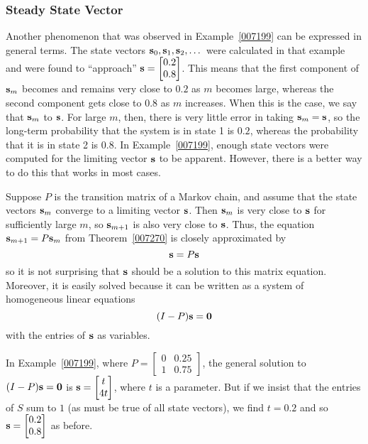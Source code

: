 \documentclass{ximera}
\begin{document}
\subsubsection*{Steady State Vector}

Another phenomenon that was observed in Example~\ref{007199} can be expressed in general terms. The state vectors ${\bf s}_{0}, {\bf s}_{1}, {\bf s}_{2}, \dots$ were calculated in that example and were found to ``approach'' ${\bf s} = \begin{bmatrix}
0.2 \\
0.8
\end{bmatrix}$.
 This means that the first component of ${\bf s}_{m}$ becomes and remains very close to $0.2$ as $m$ becomes large, whereas the second component gets close to $0.8$ as $m$ increases. When this is the case, we say that ${\bf s}_{m}$  to ${\bf s}$. For large $m$, then, there is very little error in taking ${\bf s}_{m} = {\bf s}$, so the long-term probability that the system is in state 1 is $0.2$, whereas the probability that it is in state 2 is $0.8$. In Example~\ref{007199}, enough state vectors were computed for the limiting vector ${\bf s}$ to be apparent. However, there is a better way to do this that works in most cases.

Suppose $P$ is the transition matrix of a Markov chain, and assume that the state vectors ${\bf s}_{m}$ converge to a limiting vector ${\bf s}$. Then ${\bf s}_{m}$ is very close to ${\bf s}$ for sufficiently large $m$, so ${\bf s}_{m+1}$ is also very close to ${\bf s}$. Thus, the equation ${\bf s}_{m+1} = P{\bf s}_{m}$ from Theorem~\ref{007270} is closely approximated by
\begin{equation*}
{\bf s} = P{\bf s}
\end{equation*}
so it is not surprising that ${\bf s}$ should be a solution to this matrix equation. Moreover, it is easily solved because it can be written as a system of homogeneous linear equations
\begin{equation*}
(I - P){\bf s} = {\bf 0}
\end{equation*}
with the entries of ${\bf s}$ as variables.


In Example~\ref{007199}, where $P = \begin{bmatrix}
0 & 0.25 \\
1 & 0.75
\end{bmatrix}$,
 the general solution to $(I - P){\bf s} = {\bf 0}$ is ${\bf s} = \begin{bmatrix}
 t \\
 4t
\end{bmatrix}$,
 where $t$ is a parameter. But if we insist that the entries of $S$ sum to $1$ (as must be true of all state vectors), we find $t = 0.2$ and so ${\bf s} = \begin{bmatrix}
 0.2 \\
 0.8
\end{bmatrix}$
 as before.
\end{document}
